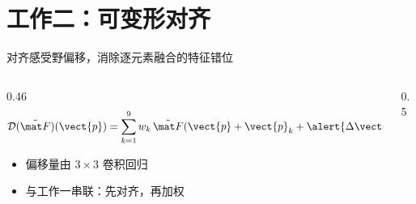 \section{工作二：可变形对齐}

\begin{frame}{对齐感受野偏移，消除逐元素融合的特征错位}
  \begin{columns}[T, onlytextwidth]
    \begin{column}{0.46\textwidth}
      \begin{equation*}
        \mathcal{D}(\tilde{\featmap})(\vect{p})
          = \sum_{k=1}^{9} w_k\,
            \tilde{\featmap}\!\left(\vect{p}+\vect{p}_k
                                    + \alert{\Delta\vect{p}_k}\right)
      \end{equation*}
      \vspace{0.6em}
      \begin{itemize}
        \setlength{\itemsep}{0.6em}
        \item 偏移量由 $3\times3$ 卷积回归
        \item 与工作一串联：先对齐，再加权
      \end{itemize}
    \end{column}
    \begin{column}{0.5\textwidth}
      \centering
    \end{column}
  \end{columns}
\end{frame}

